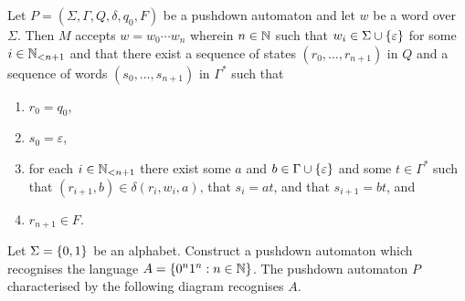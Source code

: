 Let \(P = (\Sigma, \Gamma, Q, \delta, q_0, F)\) be a pushdown automaton and let \(w\) be a word over \(\Sigma\). Then
\(M\) accepts \(w = w_0 \cdots w_n\) wherein \(n \in \setnat\) such that \(w_i \in \Sigma \cup \set{\varepsilon}\) for
some \(i \in \Nln[n + 1]\) and that there exist a sequence of states \((r_0, \ldots, r_{n + 1})\) in \(Q\) and a
sequence of words \((s_0, \ldots, s_{n + 1})\) in \(\Gamma^*\) such that
\begin{enumerate}
  \item \(r_0 = q_0\),
  \item \(s_0 = \varepsilon\),
  \item for each \(i \in \Nln[n + 1]\) there exist some \(a\) and \(b \in \Gamma \cup \set{\varepsilon}\) and some \(t
  \in \Gamma^*\) such that \((r_{i + 1}, b) \in \delta(r_i, w_i, a)\), that \(s_i = a t\), and that \(s_{i + 1} = b t\),
  and \item \(r_{n + 1} \in F\).
\end{enumerate}

\Bxr
  Let \(\Sigma = \set{0, 1}\) be an alphabet. Construct a pushdown automaton which recognises the language
  \(A = \set{0^n 1^n : n \in \setnat}\).
\Exr
\Bsl
  The pushdown automaton \(P\) characterised by the following diagram recognises \(A\).
  \begin{figure}[!ht]
    \centering
  \end{figure}

